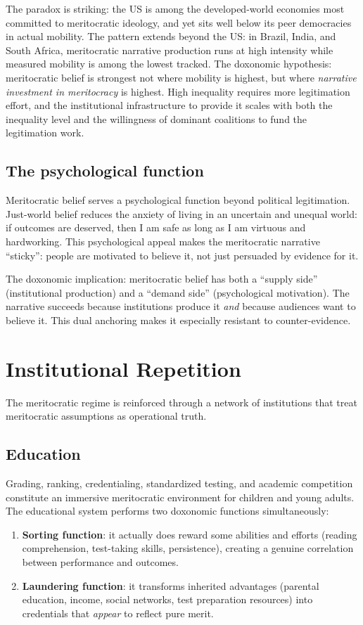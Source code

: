 The paradox is striking: the US is among the developed-world economies most committed to meritocratic ideology, and yet sits well below its peer democracies in actual mobility.
The pattern extends beyond the US: in Brazil, India, and South Africa, meritocratic narrative production runs at high intensity while measured mobility is among the lowest tracked.
The doxonomic hypothesis: meritocratic belief is strongest not where mobility is highest, but where \emph{narrative investment in meritocracy} is highest.
High inequality requires more legitimation effort, and the institutional infrastructure to provide it scales with both the inequality level and the willingness of dominant coalitions to fund the legitimation work.

\subsection{The psychological function}

Meritocratic belief serves a psychological function beyond political legitimation.
Just-world belief \autocite{lerner1980} reduces the anxiety of living in an uncertain and unequal world: if outcomes are deserved, then I am safe as long as I am virtuous and hardworking.
This psychological appeal makes the meritocratic narrative ``sticky'': people are motivated to believe it, not just persuaded by evidence for it.

The doxonomic implication: meritocratic belief has both a ``supply side'' (institutional production) and a ``demand side'' (psychological motivation).
The narrative succeeds because institutions produce it \emph{and} because audiences want to believe it.
This dual anchoring makes it especially resistant to counter-evidence.

\section{Institutional Repetition}
\label{sec:ch22-repetition}

The meritocratic regime is reinforced through a network of institutions that treat meritocratic assumptions as operational truth.

\subsection{Education}

Grading, ranking, credentialing, standardized testing, and academic competition constitute an immersive meritocratic environment for children and young adults.
The educational system performs two doxonomic functions simultaneously:
\begin{enumerate}[nosep]
  \item \textbf{Sorting function}: it actually does reward some abilities and efforts (reading comprehension, test-taking skills, persistence), creating a genuine correlation between performance and outcomes.
  \item \textbf{Laundering function}: it transforms inherited advantages (parental education, income, social networks, test preparation resources) into credentials that \emph{appear} to reflect pure merit.
\end{enumerate}

